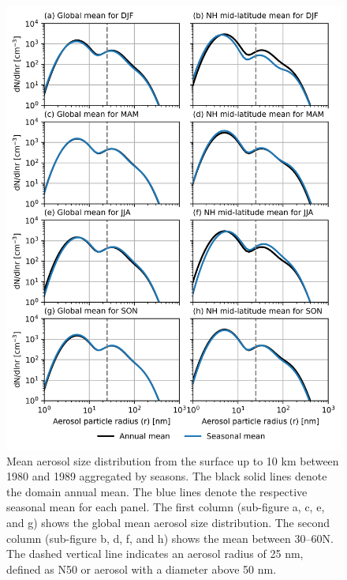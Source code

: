 \begin{figure}
    \centering
    \includegraphics{Chapter4/Figs/seasonal_aerosol_size_dist_1980.png}
    \caption[Mean aerosol size distribution from the surface up to 10 km between 1980 and 1989 aggregated by seasons]{Mean aerosol size distribution from the surface up to 10 km between 1980 and 1989 aggregated by seasons. The black solid lines denote the domain annual mean. The blue lines denote the respective seasonal mean for each panel. The first column (sub-figure a, c, e, and g) shows the global mean aerosol size distribution. The second column (sub-figure b, d, f, and h) shows the mean between 30--60\textdegree N. The dashed vertical line indicates an aerosol radius of 25 nm, defined as N50 or aerosol with a diameter above 50 nm.}
    \label{fig:ch4:seasonal-aerosol-size}
\end{figure}


